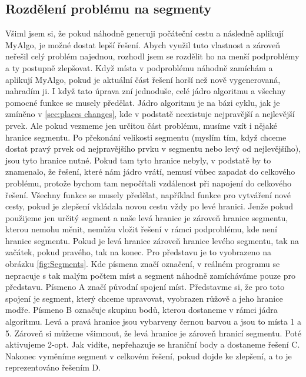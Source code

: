 \subsection{Rozdělení problému na segmenty}\label{sec:segments}
Všiml jsem si, že pokud náhodně generuji počáteční cestu a následně aplikují MyAlgo, je možné dostat lepší řešení. Abych využil tuto vlastnost a zároveň neřešil celý problém najednou, rozhodl jsem se rozdělit ho na menší podproblémy a ty postupně zlepšovat. Když místa v podproblému náhodně zamíchám a aplikují MyAlgo, pokud je aktuální část řešení horší než nově vygenerovaná, nahradím ji. I když tato úprava zní jednoduše, celé jádro algoritmu a všechny pomocné funkce se musely předělat. Jádro algoritmu je na bázi cyklu, jak je zmíněno v \ref{sec:places changes}, kde v podstatě neexistuje nejpravější a nejlevější prvek. Ale pokud vezmeme jen určitou část problému, musíme vzít i nějaké hranice segmentu. Po překonání velikosti segmentu (myslím tím, když chceme dostat pravý prvek od nejpravějšího prvku v segmentu nebo levý od nejlevějšího), jsou tyto hranice nutné. Pokud tam tyto hranice nebyly, v podstatě by to znamenalo, že řešení, které nám jádro vrátí, nemusí vůbec zapadat do celkového problému, protože bychom tam nepočítali vzdálenost při napojení do celkového řešení. Všechny funkce se musely předělat, například funkce pro vytváření nové cesty, pokud je zlepšení vkládala novou cestu vždy po levé hranici. Jenže pokud použijeme jen určitý segment a naše levá hranice je zároveň hranice segmentu, kterou nemohu měnit, nemůžu vložit řešení v rámci podproblému, kde není hranice segmentu. Pokud je levá hranice zároveň hranice levého segmentu, tak na začátek, pokud pravého, tak na konec. Pro představu je to vyobrazeno na obrázku \ref{fig:Segments}. Kde písmena značí označení, v reálném programu se nepracuje s tak malým počtem míst a segment náhodně zamícháváme pouze pro představu. Písmeno A značí původní spojení míst. Představme si, že pro toto spojení je segment, který chceme upravovat, vyobrazen růžově a jeho hranice modře. Písmeno B označuje skupinu bodů, kterou dostaneme v rámci jádra algoritmu. Levá a pravá hranice jsou vybarveny černou barvou a jsou to místa 1 a 5. Zároveň si můžeme všimnout, že levá hranice je zároveň hranicí segmentu. Poté aktivujeme 2-opt. Jak vidíte, nepřehazuje se hraniční body a dostaneme řešení C. Nakonec vyměníme segment v celkovém řešení, pokud dojde ke zlepšení, a to je reprezentováno řešením D. 

